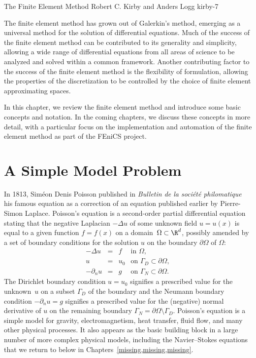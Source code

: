              {The Finite Element Method}
              {Robert C. Kirby and Anders Logg}
              {kirby-7}

The finite element method has grown out of Galerkin's method, emerging
as a universal method for the solution of differential equations. Much
of the success of the finite element method can be contributed to its
generality and simplicity, allowing a wide range of differential
equations from all areas of science to be analyzed and solved within a
common framework. Another contributing factor to the success of the
finite element method is the flexibility of formulation, allowing the
properties of the discretization to be controlled by the choice of
finite element approximating spaces.

In this chapter, we review the finite element method and introduce
some basic concepts and notation. In the coming chapters, we discuss
these concepts in more detail, with a particular focus on the
implementation and automation of the finite element method as part of
the FEniCS project.

\section{A Simple Model Problem}

In 1813, Sim\'eon Denis Poisson published
in \emph{Bulletin de la soci\'et\'e philomatique} his famous equation
as a correction of an equation published earlier by Pierre-Simon
Laplace. Poisson's equation is a second-order partial differential
equation stating that the negative Laplacian $-\Delta u$ of some
unknown field $u = u(x)$ is equal to a given function $f = f(x)$ on a
domain~$\Omega \subset \R^d$, possibly amended by a set of boundary
conditions for the solution $u$ on the boundary $\partial \Omega$ of
$\Omega$:
\begin{equation} \label{eq:poisson}
  \begin{array}{rcll}
    - \Delta u &=& f &\mbox{in } \Omega, \\
    u &=& u_0 &\mbox{on } \Gamma_D \subset \partial \Omega, \\
    - \partial_n u &=& g &\mbox{on } \Gamma_N \subset \partial \Omega.
  \end{array}
\end{equation}
The Dirichlet boundary condition $u = u_0$ signifies a prescribed
value for the unknown~$u$ on a subset $\Gamma_D$ of the boundary and
the Neumann boundary condition $-\partial_n u = g$ signifies a
prescribed value for the (negative) normal derivative of $u$ on the
remaining boundary $\Gamma_N = \partial \Omega \setminus
\Gamma_D$. Poisson's equation is a simple model for gravity,
electromagnetism, heat transfer, fluid flow, and many other physical
processes. It also appears as the basic building block in a large
number of more complex physical models, including the Navier--Stokes
equations that we return to below in
Chapters~\ref{missing,missing,missing}.

